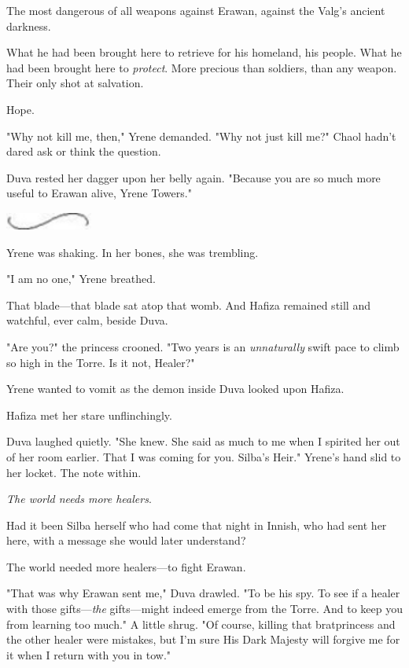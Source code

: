 The most dangerous of all weapons against Erawan, against the Valg's ancient darkness.

What he had been brought here to retrieve for his homeland, his people. What he had been brought here to \emph{protect}. More precious than soldiers, than any weapon. Their only shot at salvation.

Hope.

"Why not kill me, then," Yrene demanded. "Why not just kill me?" Chaol hadn't dared ask or think the question.

Duva rested her dagger upon her belly again. "Because you are so much more useful to Erawan alive, Yrene Towers."

\includegraphics[width=1.12in,height=0.24in]{images/seperator}

Yrene was shaking. In her bones, she was trembling.

"I am no one," Yrene breathed.

That blade---that blade sat atop that womb. And Hafiza remained still and watchful, ever calm, beside Duva.

"Are you?" the princess crooned. "Two years is an \emph{unnaturally}
swift pace to climb so high in the Torre. Is it not, Healer?"

Yrene wanted to vomit as the demon inside Duva looked upon Hafiza.

Hafiza met her stare unflinchingly.

Duva laughed quietly. "She knew. She said as much to me when I spirited her out of her room earlier. That I was coming for you. Silba's Heir." Yrene's hand slid to her locket. The note within.

\emph{The world needs more healers}.

Had it been Silba herself who had come that night in Innish, who had sent her here, with a message she would later understand?

The world needed more healers---to fight Erawan.

"That was why Erawan sent me," Duva drawled. "To be his spy. To see if a healer with those gifts---\emph{the} gifts---might indeed emerge from the Torre. And to keep you from learning too much." A little shrug. "Of course, killing that bratprincess and the other healer were
 mistakes, but I'm sure His Dark Majesty will forgive me for it when I return with you in tow."


